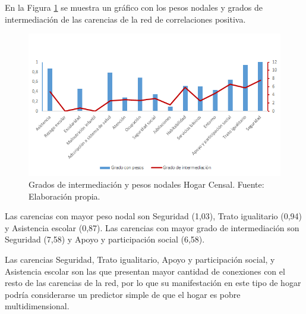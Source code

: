 \documentclass[12pt,letterpaper,spanish]{article}
\begin{document}
En la Figura \ref{CenCensal} se muestra un gráfico con los pesos nodales y grados de intermediación de las carencias de la red de correlaciones positiva.

\begin{figure}[H]
    \centering
    \includegraphics[width=\textwidth]{Grafos/nc_censal.png}
    \caption{Grados de intermediación y pesos nodales Hogar Censal. Fuente: Elaboración propia.}
    \label{CenCensal}
\end{figure}
Las carencias con mayor peso nodal son Seguridad (1,03), Trato igualitario (0,94) y Asistencia escolar (0,87). Las carencias con mayor grado de intermediación son Seguridad (7,58) y Apoyo y participación social (6,58).

Las carencias Seguridad, Trato igualitario, Apoyo y participación social, y Asistencia escolar son las que presentan mayor cantidad de conexiones con el resto de las carencias de la red, por lo que su manifestación en este tipo de hogar podría considerarse un predictor simple de que el hogar es pobre multidimensional. 
\end{document}
